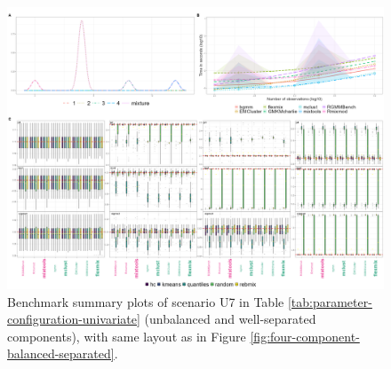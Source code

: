 \begin{figure}

{\centering \includegraphics[width=1\linewidth]{./figs/univariate/univariate_unbalanced_separated} 

}

\caption{Benchmark summary plots of scenario U7 in Table \ref{tab:parameter-configuration-univariate} (unbalanced and well-separated components), with same layout as in Figure \ref{fig:four-component-balanced-separated}.}\label{fig:four-component-unbalanced-separated}
\end{figure}

\newpage

